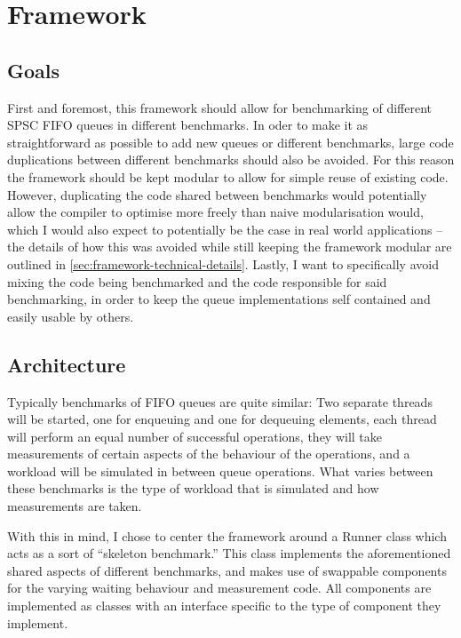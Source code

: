 \section{Framework}
\subsection{Goals}
First and foremost, this framework should allow for benchmarking of different SPSC FIFO queues in different benchmarks.
In oder to make it as straightforward as possible to add new queues or different benchmarks, large code
duplications between different benchmarks should also be avoided.
For this reason the framework should be kept modular to allow for simple reuse of existing code.
However, duplicating the code shared between benchmarks would potentially allow the compiler to optimise more
freely than naive modularisation would, which I would also expect to potentially be the case in real world
applications -- the details of how this was avoided while still keeping the framework modular are outlined in
\autoref{sec:framework-technical-details}.
Lastly, I want to specifically avoid mixing the code being benchmarked and the code responsible for said
benchmarking, in order to keep the queue implementations self contained and easily usable by others.

\subsection{Architecture}
Typically benchmarks of FIFO queues are quite similar\cite{EQueue,B-Queue,MCRingBuffer}:
Two separate threads will be started, one for enqueuing and one for dequeuing elements,
each thread will perform an equal number of successful operations,
they will take measurements of certain aspects of the behaviour of the operations,
and a workload will be simulated in between queue operations.
What varies between these benchmarks is the type of workload that is simulated and how measurements are taken.

With this in mind, I chose to center the framework around a Runner class which acts as a sort of ``skeleton benchmark.''
This class implements the aforementioned shared aspects of different benchmarks, and makes use of swappable
components for the varying waiting behaviour and measurement code.
All components are implemented as classes with an interface specific to the type of component they implement.

